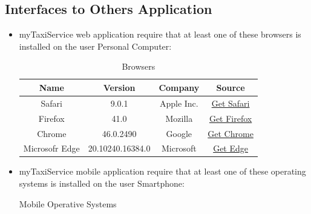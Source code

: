 		\subsection{Interfaces to Others Application}
			\begin{itemize}
				\item myTaxiService web application require that at least one of these browsers is installed on the user Personal Computer:
			
					\begin{center}
						\begin{table}[h!]
							
							\begin{center}
								\caption{Browsers}
								\label{tab:browsersTable}

								\begin{tabular}{cccc}
									\toprule
									\textbf{Name} & \textbf{Version} & \textbf{Company} & \textbf{Source}\\
									\midrule
									Safari & 9.0.1 & Apple Inc. & \href{http://www.apple.com/safari/}{Get Safari}\\
									\midrule
									Firefox & 41.0 & Mozilla & \href{https://www.mozilla.org/en-US/firefox/new/}{Get Firefox}\\
									\midrule
									Chrome & 46.0.2490 & Google & \href{https://www.google.com/chrome/browser/desktop/}{Get Chrome}\\
									\midrule
									Microsofr Edge & 20.10240.16384.0 & Microsoft & \href{https://www.microsoft.com/en-us/download/details.aspx?id=48126}{Get Edge}\\
									\bottomrule
								\end{tabular}
							\end{center}
							
						\end{table}
					\end{center}

				\item myTaxiService mobile application require that at least one of these operating systems is installed on the user Smartphone:

					\begin{center}
						\begin{table}[h!]
							
							\begin{center}
								\caption{Mobile Operative Systems}
								\label{tab:mobileOSTable}


\end{center}
\end{table}
\end{center}
\end{itemize}

